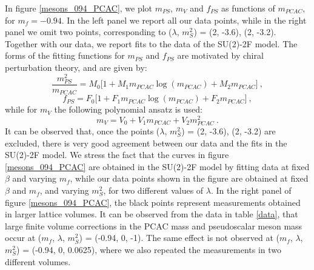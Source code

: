 In figure \ref{mesons_094_PCAC}, we plot $m_{PS}$, $m_V$ and $f_{PS}$ as functions of $m_{PCAC}$, for $m_f = -0.94$. In the left panel we report all our data points, while in the right panel we omit two points, corresponding to ($\lambda$, $m_S^2$) = (2, -3.6), (2, -3.2). Together with our data, we report fits to the data of the SU(2)-2F model. The forms of the fitting functions for $m_{PS}$ and $f_{PS}$ are motivated by chiral perturbation theory, and are given by:
\begin{equation}
\frac{m_{PS}^2}{m_{PCAC}} = M_0 \bigl[ 1 + M_1 m_{PCAC} \log (m_{PCAC}) + M_2 m_{PCAC} \bigr] \: ,
\label{fit_PS}
\end{equation}
\begin{equation}
f_{PS} = F_0 \bigl[ 1+ F_1 m_{PCAC} \log (m_{PCAC}) + F_2 m_{PCAC} \bigr] \: ,
\label{fit_fPS}
\end{equation}
%
while for $m_V$ the following polynomial ansatz is used:
\begin{equation}
m_V = V_0 + V_1 m_{PCAC} + V_2 m_{PCAC}^2 \: .
\label{fit_V}
\end{equation}
%
It can be observed that, once the points ($\lambda$, $m_S^2$) = (2, -3.6), (2, -3.2) are excluded, there is very good agreement between our data and the fits in the SU(2)-2F model. We stress the fact that the curves in figure \ref{mesons_094_PCAC} are obtained in the SU(2)-2F model by fitting data at fixed $\beta$ and varying $m_f$, while our data points shown in the figure are obtained at fixed $\beta$ and $m_f$, and varying $m_S^2$, for two different values of $\lambda$. In the right panel of figure \ref{mesons_094_PCAC}, the black points represent measurements obtained in larger lattice volumes. It can be observed from the data in table \ref{data}, that large finite volume corrections in the PCAC mass and pseudoscalar meson mass occur at ($m_f$, $\lambda$, $m_S^2$) = (-0.94, 0, -1). The same effect is not observed at ($m_f$, $\lambda$, $m_S^2$) = (-0.94, 0, 0.0625), where we also repeated the measurements in two different volumes. 


